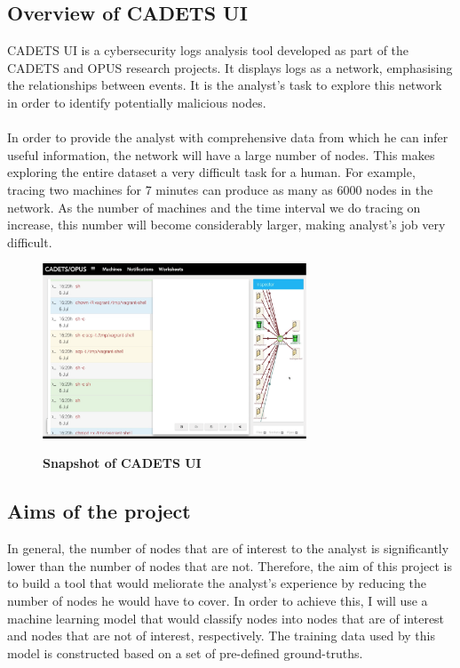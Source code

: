 \documentclass[12pt,a4paper,twoside,openright]{report}
\begin{document}
\subsection{Overview of CADETS UI}\label{1.1.1}
CADETS UI is a cybersecurity logs analysis tool developed as part of the CADETS and OPUS research projects. It displays logs as a network, emphasising the relationships between events. It is the analyst's task to explore this network in order to identify potentially malicious nodes.
\\ \\
In order to provide the analyst with comprehensive data from which he can infer useful information, the network will have a large number of nodes. This makes exploring the entire dataset a very difficult task for a human.  For example, tracing two machines for 7 minutes can produce as many as 6000 nodes in the network.  As the number of machines and the time interval we do tracing on increase, this number will become considerably larger, making analyst's job very difficult. 
\begin{figure}[H]
	\caption{\bf Snapshot of CADETS UI}
	\centering
	\includegraphics[width=0.7\textwidth]{graphics/CADETS}
	\label{Figure 1.1}
\end{figure}

\subsection{Aims of the project}
In general, the number of nodes that are of interest to the analyst is significantly lower than the number of nodes that are not. Therefore, the aim of this project is to build a tool that would meliorate the analyst's experience by reducing the number of nodes he would have to cover. In order to achieve this, I will use a machine learning model that would classify nodes into nodes that are of interest and nodes that are not of interest, respectively. The training data used by this model is constructed based on a set of pre-defined ground-truths. 
\end{document}
